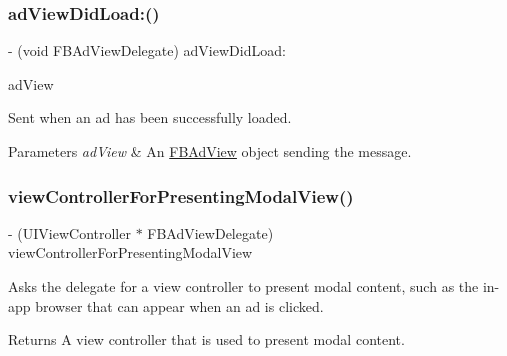 \subsubsection{\texorpdfstring{ad\+View\+Did\+Load\+:()}{adViewDidLoad:()}\hspace{0.1cm}{\footnotesize\ttfamily [5/5]}}
{\footnotesize\ttfamily -\/ (void F\+B\+Ad\+View\+Delegate) ad\+View\+Did\+Load\+: \begin{DoxyParamCaption}\item[{(\hyperlink{interfaceFBAdView}{F\+B\+Ad\+View} $\ast$)}]{ad\+View }\end{DoxyParamCaption}\hspace{0.3cm}{\ttfamily [optional]}}

Sent when an ad has been successfully loaded.


\begin{DoxyParams}{Parameters}
{\em ad\+View} & An \hyperlink{interfaceFBAdView}{F\+B\+Ad\+View} object sending the message. \\
\hline
\end{DoxyParams}
\mbox{\label{protocolFBAdViewDelegate_01-p_abb65fb95527f0571d4a298beb1e6e299}} 
\subsubsection{\texorpdfstring{view\+Controller\+For\+Presenting\+Modal\+View()}{viewControllerForPresentingModalView()}\hspace{0.1cm}{\footnotesize\ttfamily [1/5]}}
{\footnotesize\ttfamily -\/ (U\+I\+View\+Controller $\ast$ F\+B\+Ad\+View\+Delegate) view\+Controller\+For\+Presenting\+Modal\+View \begin{DoxyParamCaption}{ }\end{DoxyParamCaption}\hspace{0.3cm}{\ttfamily [optional]}}

Asks the delegate for a view controller to present modal content, such as the in-\/app browser that can appear when an ad is clicked.

\begin{DoxyReturn}{Returns}
A view controller that is used to present modal content. 
\end{DoxyReturn}
\mbox{\label{protocolFBAdViewDelegate_01-p_abb65fb95527f0571d4a298beb1e6e299}} 
